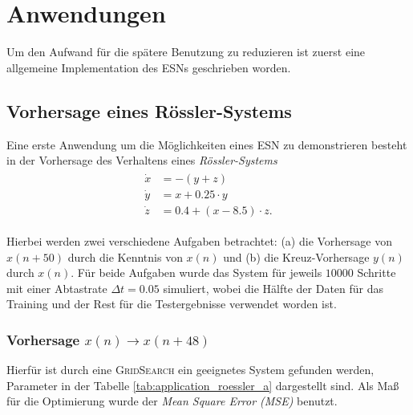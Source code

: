 \chapter{Anwendungen}
Um den Aufwand für die spätere Benutzung zu reduzieren ist zuerst eine allgemeine Implementation des \textsc{ESN}s geschrieben worden. 

\section{Vorhersage eines Rössler-Systems}
Eine erste Anwendung um die Möglichkeiten eines \textsc{ESN} zu demonstrieren besteht in der Vorhersage des Verhaltens eines \textit{Rössler-Systems}
\begin{align}
\label{eq:application_roessler_pde}
\begin{split}
\dot{x} &= -(y+z)\\
\dot{y} &= x + 0.25 \cdot  y\\
\dot{z} &= 0.4 + (x - 8.5)\cdot z.
\end{split} 
\end{align}

Hierbei werden zwei verschiedene Aufgaben betrachtet: (a) die Vorhersage von $x(n+50)$ durch die Kenntnis von $x(n)$ und (b) die Kreuz-Vorhersage $y(n)$ durch $x(n)$. Für beide Aufgaben wurde das System für jeweils $10000$ Schritte mit einer Abtastrate $\Delta t = 0.05$ simuliert, wobei die Hälfte der Daten für das Training und der Rest für die Testergebnisse verwendet worden ist.

\subsection{Vorhersage $x(n) \rightarrow x(n+48)$}
Hierfür ist durch eine \textsc{GridSearch} ein geeignetes System gefunden werden, Parameter in der Tabelle \ref{tab:application_roessler_a} dargestellt sind. Als Maß für die Optimierung wurde der \textit{Mean Square Error (MSE)} benutzt. 


